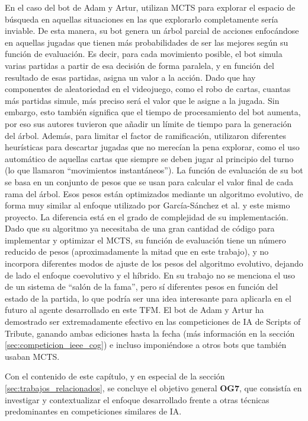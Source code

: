 En el caso del bot de Adam y Artur, utilizan MCTS para explorar el espacio de búsqueda en aquellas situaciones en las que explorarlo completamente sería inviable. De esta manera, su bot genera un árbol parcial de acciones enfocándose en aquellas jugadas que tienen más probabilidades de ser las mejores según su función de evaluación. Es decir, para cada movimiento posible, el bot simula varias partidas a partir de esa decisión de forma paralela, y en función del resultado de esas partidas, asigna un valor a la acción. Dado que hay componentes de aleatoriedad en el videojuego, como el robo de cartas, cuantas más partidas simule, más preciso será el valor que le asigne a la jugada. Sin embargo, esto también significa que el tiempo de procesamiento del bot aumenta, por eso sus autores tuvieron que añadir un límite de tiempo para la generación del árbol. Además, para limitar el factor de ramificación, utilizaron diferentes heurísticas para descartar jugadas que no merecían la pena explorar, como el uso automático de aquellas cartas que siempre se deben jugar al principio del turno (lo que llamaron ``movimientos instantáneos''). La función de evaluación de su bot se basa en un conjunto de pesos que se usan para calcular el valor final de cada rama del árbol. Esos pesos están optimizados mediante un algoritmo evolutivo, de forma muy similar al enfoque utilizado por García-Sánchez et al. y este mismo proyecto. La diferencia está en el grado de complejidad de su implementación. Dado que su algoritmo ya necesitaba de una gran cantidad de código para implementar y optimizar el MCTS, su función de evaluación tiene un número reducido de pesos (aproximadamente la mitad que en este trabajo), y no incorpora diferentes modos de ajuste de los pesos del algoritmo evolutivo, dejando de lado el enfoque coevolutivo y el híbrido. En su trabajo no se menciona el uso de un sistema de ``salón de la fama'', pero sí diferentes pesos en función del estado de la partida, lo que podría ser una idea interesante para aplicarla en el futuro al agente desarrollado en este TFM. El bot de Adam y Artur ha demostrado ser extremadamente efectivo en las competiciones de IA de Scripts of Tribute, ganando ambas ediciones hasta la fecha (más información en la sección \ref{sec:competicion_ieee_cog}) e incluso imponiéndose a otros bots que también usaban MCTS.

Con el contenido de este capítulo, y en especial de la sección \ref{sec:trabajos_relacionados}, se concluye el objetivo general \textbf{OG7}, que consistía en investigar y contextualizar el enfoque desarrollado frente a otras técnicas predominantes en competiciones similares de IA.